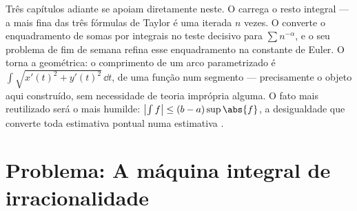 \begin{remark}
Três capítulos adiante se apoiam diretamente neste.
O  carrega o resto integral --- a
mais fina das três fórmulas de Taylor é uma 
iterada $n$ vezes. O  converte o enquadramento de
somas por integrais no teste decisivo para $\sum n^{-\alpha}$,
e o seu problema de fim de semana refina esse enquadramento na
constante de Euler. O  torna a  geométrica: o
comprimento de um arco parametrizado é $\int \sqrt{x'(t)^2 +
y'(t)^2}\,\dd t$,  de uma função  num
segmento --- precisamente o objeto aqui construído, sem necessidade de
teoria imprópria alguma. O fato mais reutilizado será o mais humilde:
$\bigl|\int f\bigr| \leq (b - a)\sup\abs{f}$, a desigualdade
que converte toda estimativa pontual numa estimativa .
\end{remark}

\section{Problema: A máquina integral de irracionalidade}


